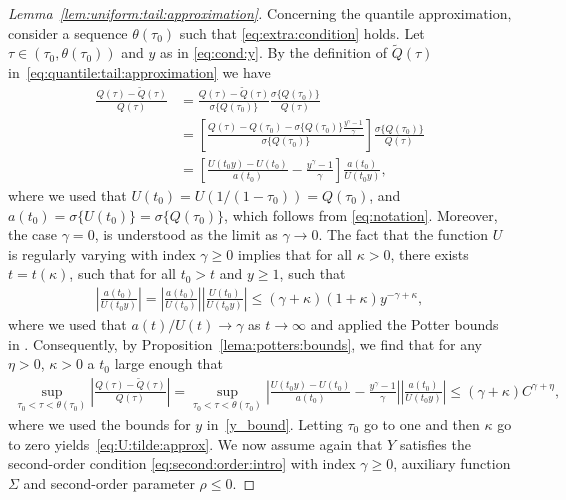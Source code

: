 \documentclass{statsoc}
\theoremstyle{break}
\newcommand{\tauzero}{\tau_0}
\newcommand{\tzero}{t_0}
\newcommand{\beam}{\begin{eqnarray}}
\newcommand{\eeam}{\end{eqnarray}\noindent}
\begin{document}
\begin{proof}[Lemma~\ref{lem:uniform:tail:approximation}]
		 

 Concerning the quantile approximation, consider a sequence $\theta(\tau_0)$ such that \eqref{eq:extra:condition} holds. Let $\tau \in ( \tau_0,\theta(\tau_0))$ and $y$ as in \eqref{eq:cond:y}. 
	By the definition of $\tilde Q(\tau)$ in~\eqref{eq:quantile:tail:approximation} we have 
 \begin{align*}
 \frac{ Q(\tau) - \tilde Q(\tau)} {Q(\tau) } & = \frac{ Q(\tau) - \tilde Q(\tau)} {  \sigma\{Q(\tau_0)\}}  \frac{\sigma\{Q(\tau_0)\}}{ Q(\tau)}\\
	& = \left[ \frac{ Q(\tau) - Q(\tauzero) - \sigma\{Q(\tau_0)\}\frac{y^\gamma - 1}{\gamma}} {\sigma\{Q(\tau_0)\}} \right] \frac{\sigma\{Q(\tau_0)\}}{ Q(\tau)} \\
	& = \left[\frac{ U(\tzero y) - U(\tzero)} { a(\tzero) } - \frac{y^\gamma - 1}{\gamma}\right] \frac{a(\tzero)}{U(t_0 y)} , 
\end{align*}
where we used that $U(t_0) = U(1/(1-\tau_0)) = Q(\tau_0)$, and $a(t_0) = \sigma\{U(t_0)\} = \sigma\{Q(\tau_0)\}$, which follows from \eqref{eq:notation}. Moreover, the case $\gamma = 0$, is understood as the limit as $\gamma \to 0$.
The fact that the function $U$ is regularly varying with index $\gamma \geq 0$ implies that for all $\kappa > 0$, there exists $t = t(\kappa )$, such that for all $t_0 > t$ and $y \geq 1$, such that
\beam \label{eq:sigma:q}
  \left| \frac{a(t_0)}{U(t_0 y ) }  \right| =  \left| \frac{a(t_0)}{U(t_0 ) }  \right| \left| \frac{U(t_0)}{U(t_0 y) }  \right|  \leq (\gamma +\kappa ) (1+\kappa )  y^{-\gamma + \kappa },
\eeam
where we used that $a(t) / U(t) \to \gamma$ as $t\to\infty$ \citep[Lemma 1.2.9]{dehaan:ferreira:2006} and applied the Potter bounds in \cite[Proposition B.1.9]{dehaan:ferreira:2006}. 
Consequently, by Proposition~\ref{lema:potters:bounds}, we find that for any $\eta > 0$, $\kappa > 0$ a $\tzero$ large enough that 
\begin{align}\label{eq:bound:q:sigma}
	\sup_{\tau_0 < \tau < \theta(\tau_0) }\left| \frac{ Q(\tau) - \tilde Q(\tau)} { Q(\tau)}   \right| = \sup_{\tau_0 < \tau < \theta(\tau_0) } \left|\frac{ U(\tzero y) - U(\tzero)} { a(\tzero) } - \frac{y^\gamma - 1}{\gamma}\right| \left| \frac{a(\tzero)}{ U(t_0y)} \right| \leq (\gamma + \kappa  ) C^{\gamma + \eta},
\end{align}
where we used the bounds for $y$ in~\eqref{y_bound}.
Letting $\tauzero$ go to one and then $\kappa$ go to zero yields~\eqref{eq:U:tilde:approx}.
We now assume again that $Y$ satisfies the second-order condition \eqref{eq:second:order:intro} with index $\gamma \geq 0$, auxiliary function $\Sigma$ and second-order parameter $\rho \leq 0$. 

\end{proof}
\end{document}
